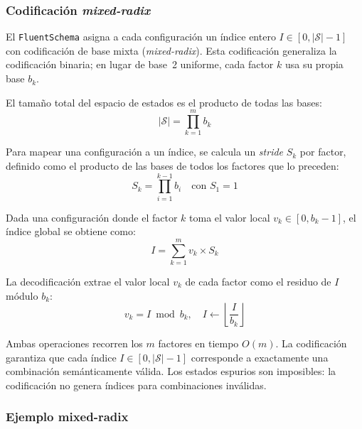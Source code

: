 \subsubsection{Codificación \textit{mixed-radix}}
\label{sec:di-mixed-radix}

El \texttt{FluentSchema} asigna a cada configuración un índice entero
$I \in [0, |\mathcal{S}| - 1]$ con codificación de base mixta
(\textit{mixed-radix}). Esta codificación generaliza la codificación binaria;
en lugar de base~2 uniforme, cada factor $k$ usa su propia base $b_k$.

El tamaño total del espacio de estados es el producto de todas las bases:
\begin{equation}
    |\mathcal{S}| = \prod_{k=1}^{m} b_k
    \label{eq:tamano-espacio}
\end{equation}

Para mapear una configuración a un índice, se calcula un \textit{stride} $S_k$ por
factor, definido como el producto de las bases de todos los factores que lo preceden:
\begin{equation}
    S_k = \prod_{i=1}^{k-1} b_i \quad \text{con } S_1 = 1
    \label{eq:strides}
\end{equation}

Dada una configuración donde el factor $k$ toma el valor local $v_k \in [0, b_k - 1]$,
el índice global se obtiene como:
\begin{equation}
    I = \sum_{k=1}^{m} v_k \times S_k
    \label{eq:codificacion}
\end{equation}

La decodificación extrae el valor local $v_k$ de cada factor como el residuo de
$I$ módulo $b_k$:
\begin{equation}
    v_k = I \bmod b_k, \quad I \leftarrow \left\lfloor \frac{I}{b_k} \right\rfloor
    \label{eq:decodificacion}
\end{equation}

Ambas operaciones recorren los $m$ factores en tiempo $O(m)$. La codificación
garantiza que cada índice $I \in [0, |\mathcal{S}| - 1]$ corresponde a exactamente
una combinación semánticamente válida. Los estados espurios son imposibles: la codificación no genera índices para
combinaciones inválidas.

\subsubsection{Ejemplo mixed-radix}
\label{sec:di-mixed-radix-ejemplo}

